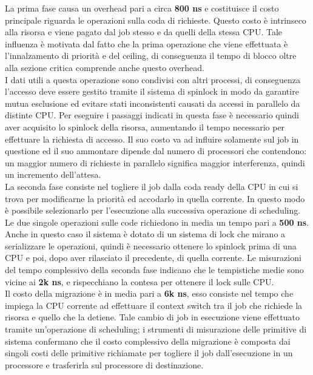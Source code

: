 La prima fase causa un overhead pari a circa \textbf{800 ns} e costituisce il costo principale riguarda le operazioni sulla coda di richieste. Questo costo è intrinseco alla risorsa e viene pagato dal job stesso e da quelli della stessa CPU. Tale influenza è motivata dal fatto che la prima operazione che viene effettuata è l'innalzamento di priorità e del ceiling, di conseguenza il tempo di blocco oltre alla sezione critica comprende anche questo overhead.\\

I dati utili a questa operazione sono condivisi con altri processi, di conseguenza l'accesso deve essere gestito tramite il sistema di spinlock in modo da garantire mutua esclusione ed evitare stati inconsistenti causati da accessi in parallelo da distinte CPU. Per eseguire i passaggi indicati in questa fase è necessario quindi aver acquisito lo spinlock della risorsa, aumentando il tempo necessario per effettuare la richiesta di accesso. Il suo costo va ad influire solamente sul job in questione ed il suo ammontare dipende dal numero di processori che contendono: un maggior numero di richieste in parallelo significa maggior interferenza, quindi un incremento dell'attesa.\\

La seconda fase consiste nel togliere il job dalla coda ready della CPU in cui si trova per modificarne la priorità ed accodarlo in quella corrente. In questo modo è possibile selezionarlo per l'esecuzione alla successiva operazione di scheduling. Le due singole operazioni sulle code richiedono in media un tempo pari a \textbf{500 ns}. Anche in questo caso il sistema è dotato di un sistema di lock che mirano a serializzare le operazioni, quindi è necessario ottenere lo spinlock prima di una CPU e poi, dopo aver rilasciato il precedente, di quella corrente. Le misurazioni del tempo complessivo della seconda fase indicano che le tempistiche medie sono vicine ai \textbf{2k ns}, e rispecchiano la contesa per ottenere il lock sulle CPU.\\

Il costo della migrazione è in media pari a \textbf{6k ns}, esso consiste nel tempo che impiega la CPU corrente ad effettuare il context switch tra il job che richiede la risorsa e quello che la detiene. Tale cambio di job in esecuzione viene effettuato tramite un'operazione di scheduling; i strumenti di misurazione delle primitive di sistema confermano che il costo complessivo della migrazione è composta dai singoli costi delle primitive richiamate per togliere il job dall'esecuzione in un processore e trasferirla sul processore di destinazione.\\


